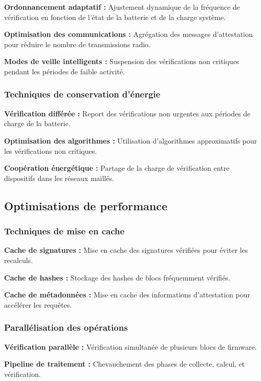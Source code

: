 \textbf{Ordonnancement adaptatif :} Ajustement dynamique de la fréquence de vérification en fonction de l'état de la batterie et de la charge système.

\textbf{Optimisation des communications :} Agrégation des messages d'attestation pour réduire le nombre de transmissions radio.

\textbf{Modes de veille intelligents :} Suspension des vérifications non critiques pendant les périodes de faible activité.

\subsubsection{Techniques de conservation d'énergie}

\textbf{Vérification différée :} Report des vérifications non urgentes aux périodes de charge de la batterie.

\textbf{Optimisation des algorithmes :} Utilisation d'algorithmes approximatifs pour les vérifications non critiques.

\textbf{Coopération énergétique :} Partage de la charge de vérification entre dispositifs dans les réseaux maillés.

\subsection{Optimisations de performance}

\subsubsection{Techniques de mise en cache}

\textbf{Cache de signatures :} Mise en cache des signatures vérifiées pour éviter les recalculs.

\textbf{Cache de hashes :} Stockage des hashes de blocs fréquemment vérifiés.

\textbf{Cache de métadonnées :} Mise en cache des informations d'attestation pour accélérer les requêtes.

\subsubsection{Parallélisation des opérations}

\textbf{Vérification parallèle :} Vérification simultanée de plusieurs blocs de firmware.

\textbf{Pipeline de traitement :} Chevauchement des phases de collecte, calcul, et vérification.


